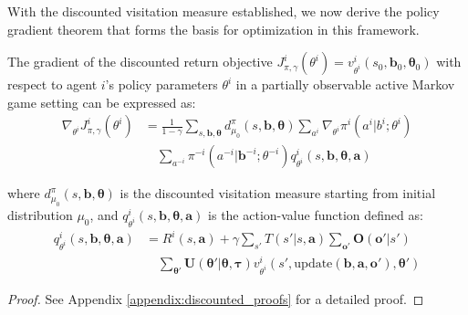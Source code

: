 With the discounted visitation measure established, we now derive the policy gradient theorem that forms the basis for optimization in this framework.
\begin{theorem}
    \label{thm:discounted_gradient}
    The gradient of the discounted return objective $J^i_{\pi, \gamma}(\theta^i) = v^i_{\theta^i}(s_0, \boldsymbol{b}_0, \boldsymbol{\theta}_0)$ with respect to agent $i$'s policy parameters $\theta^i$ in a partially observable active Markov game setting can be expressed as:
    \begin{align}
        \nabla_{\theta^i} J^{i}_{\pi, \gamma}(\theta^i) & = \frac{1}{1-\gamma} \sum_{s, \boldsymbol{b}, \boldsymbol{\theta}} d^{\pi}_{\mu_0}(s, \boldsymbol{b}, \boldsymbol{\theta}) \sum_{a^i} \nabla_{\theta^i} \pi^i(a^i|b^i; \theta^i) \nonumber \\
                                                 & \quad \sum_{a^{-i}} \pi^{-i}(a^{-i}|\boldsymbol{b}^{-i}; \theta^{-i}) q^i_{\theta^i}(s, \boldsymbol{b}, \boldsymbol{\theta}, \boldsymbol{a})
        \label{eq:discounted_gradient}
    \end{align}

    where $d^{\pi}_{\mu_0}(s, \boldsymbol{b}, \boldsymbol{\theta})$ is the discounted visitation measure starting from initial distribution $\mu_0$, and $q^i_{\theta^i}(s, \boldsymbol{b}, \boldsymbol{\theta}, \boldsymbol{a})$ is the action-value function defined as:
    \begin{align}
        q^i_{\theta^i}(s, \boldsymbol{b}, \boldsymbol{\theta}, \boldsymbol{a}) & = R^i(s, \boldsymbol{a}) + \gamma \sum_{s'} T(s'|s, \boldsymbol{a}) \sum_{\boldsymbol{o}'} \boldsymbol{O}(\boldsymbol{o}'|s') \nonumber                                                                                \\
                                                                               & \quad \sum_{\boldsymbol{\theta}'} \boldsymbol{U}(\boldsymbol{\theta}'|\boldsymbol{\theta}, \boldsymbol{\tau}) v^i_{\theta^i}(s', \text{update}(\boldsymbol{b}, \boldsymbol{a}, \boldsymbol{o}'), \boldsymbol{\theta}')
    \label{eq:discounted_action_value}
                                                                            \end{align}

\end{theorem}

\begin{proof}
    See Appendix \ref{appendix:discounted_proofs} for a detailed proof.
\end{proof}

